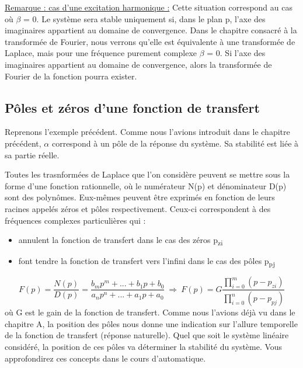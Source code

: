 \documentclass[]{report}
\begin{document}
	\underline{Remarque : cas d'une excitation harmonique :}
	Cette situation correspond au cas où $\beta $ = 0. Le système sera stable
	uniquement si, dans le plan p, l'axe des imaginaires appartient au
	domaine de convergence. Dans le chapitre consacré à la transformée de
	Fourier, nous verrons qu'elle est équivalente à une transformée de
	Laplace, mais pour une fréquence purement complexe $\beta $ = 0. Si l'axe des
	imaginaires appartient au domaine de convergence, alors la transformée
	de Fourier de la fonction pourra exister.
	
	\subsection{Pôles et zéros d'une fonction de transfert}
	
	Reprenons l'exemple précédent. Comme nous l'avions introduit dans le
	chapitre précédent, $\alpha $ correspond à un pôle de la réponse du système. Sa
	stabilité est liée à sa partie réelle.~
	
	Toutes les trasnformées de Laplace que l'on considère peuvent se mettre sous la forme d'une
	fonction rationnelle, où le numérateur N(p) et dénominateur D(p) sont
	des polynômes. Eux-mêmes peuvent être exprimés en fonction de leurs
	racines appelés zéros et pôles respectivement. Ceux-ci correspondent à
	des fréquences complexes particulières qui :
	\begin{itemize}
		\item annulent la fonction de transfert dans le cas des zéros p\textsubscript{zi}
	
		\item font tendre la fonction de transfert vers l'infini dans le cas des pôles p\textsubscript{pj}
	\end{itemize}
	
	\begin{equation}\label{key}
	F(p) = \frac{N(p)}{D(p)} = \frac{b_{m}p^{m}+...+b_{1}p+b_{0}}{a_{n}p^{n}+...+a_{1}p+a_{0}} ~\Rightarrow ~ F(p) = G \frac{\prod_{i=0}^{m}(p-p_{zi})}{\prod_{i=0}^{n}(p-p_{pj})}
	\end{equation}
	où G est le gain de la fonction de transfert.
	Comme nous l'avions déjà vu dans le chapitre A, la position des pôles nous donne une indication sur l'allure temporelle de la fonction de transfert (réponse naturelle).
	Quel que soit le système linéaire considéré, la position de ces pôles va déterminer la stabilité du système. Vous approfondirez ces concepts dans le cours d'automatique.
	
\end{document}
